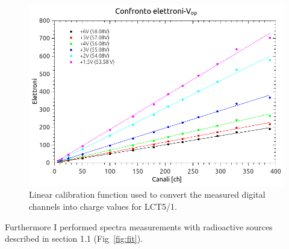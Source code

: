 \documentclass[10pt,a4paper, openany]{book}
\begin{document}
\begin{figure}[!h]
\begin{center}
\includegraphics[scale=0.5]{imm/confronto_tot.png}
\end{center}
\caption{Linear calibration function used to convert the measured digital channels into charge values for LCT5/1.}
\label{fig:lin1}
\end{figure}
Furthermore I performed spectra measurements with radioactive sources described in section 1.1 (Fig~\ref{fig:fit}).\\
\end{document}
